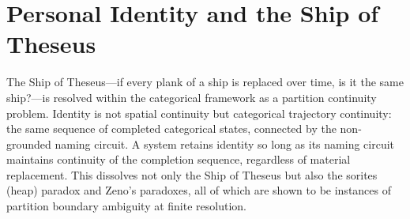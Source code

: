 \chapter{Personal Identity and the Ship of Theseus}
\label{ch:ship_of_theseus}


\begin{chapterabstract}
The Ship of Theseus---if every plank of a ship is replaced over time, is it the same ship?---is resolved within the categorical framework as a partition continuity problem. Identity is not spatial continuity but categorical trajectory continuity: the same sequence of completed categorical states, connected by the non-grounded naming circuit. A system retains identity so long as its naming circuit maintains continuity of the completion sequence, regardless of material replacement. This dissolves not only the Ship of Theseus but also the sorites (heap) paradox and Zeno's paradoxes, all of which are shown to be instances of partition boundary ambiguity at finite resolution.
\end{chapterabstract}




